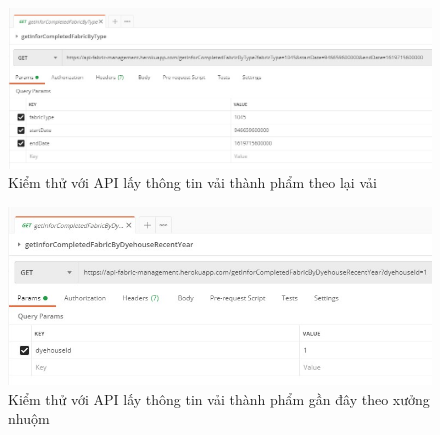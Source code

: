 \begin{figure}[H]
    \begin{center}
        \includegraphics[width=12cm]{Image/API/38_getInforCompletedFabricByType.jpg}
        \caption{Kiểm thử với API lấy thông tin vải thành phẩm theo lại vải}
        \label{getInforCompletedFabricByType}
    \end{center}
\end{figure}
\begin{figure}[H]
    \begin{center}
        \includegraphics[width=12cm]{Image/API/39_getInforCompletedFabricByDyehouseRecentYear.jpg}
        \caption{Kiểm thử với API lấy thông tin vải thành phẩm gần đây theo xưởng nhuộm}
        \label{getInforCompletedFabricByDyehouseRecentYear}
    \end{center}
\end{figure}


